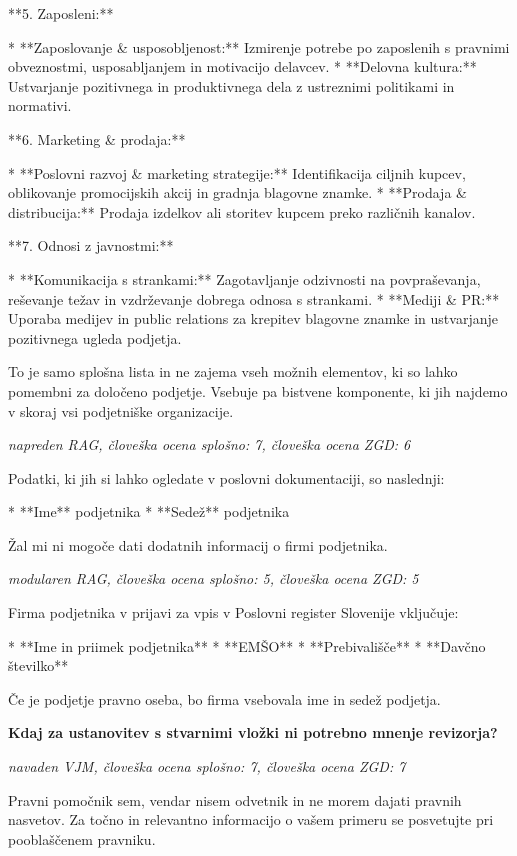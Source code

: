 \documentclass[a4paper,12pt,openright]{book}
\begin{document}
**5. Zaposleni:**

* **Zaposlovanje \& usposobljenost:** Izmirenje potrebe po zaposlenih s pravnimi obveznostmi, usposabljanjem in motivacijo delavcev.
* **Delovna kultura:** Ustvarjanje pozitivnega in produktivnega dela z ustreznimi politikami in normativi.

**6. Marketing \& prodaja:**

* **Poslovni razvoj \& marketing strategije:**  Identifikacija ciljnih kupcev, oblikovanje promocijskih akcij in gradnja blagovne znamke.
* **Prodaja \& distribucija:** Prodaja izdelkov ali storitev kupcem preko različnih kanalov.

**7. Odnosi z javnostmi:**

* **Komunikacija s strankami:** Zagotavljanje odzivnosti na povpraševanja, reševanje težav in vzdrževanje dobrega odnosa s strankami.
* **Mediji \& PR:** Uporaba medijev in public relations za krepitev blagovne znamke in ustvarjanje pozitivnega ugleda podjetja.


To je samo splošna lista in ne zajema vseh možnih elementov, ki so lahko pomembni za določeno podjetje. Vsebuje pa bistvene komponente, ki jih najdemo v skoraj vsi podjetniške organizacije.

\vspace{0.5cm}
\textit{napreden RAG, človeška ocena splošno: 7, človeška ocena ZGD: 6}

Podatki, ki jih si lahko ogledate v poslovni dokumentaciji, so naslednji:

* **Ime** podjetnika
* **Sedež** podjetnika


Žal mi ni mogoče dati dodatnih informacij o firmi podjetnika.

\vspace{0.5cm}
\textit{modularen RAG, človeška ocena splošno: 5, človeška ocena ZGD: 5}

Firma podjetnika v prijavi za vpis v Poslovni register Slovenije vključuje:

* **Ime in priimek podjetnika**
* **EMŠO**
* **Prebivališče**
* **Davčno številko**


Če je podjetje pravno oseba, bo firma vsebovala ime in sedež podjetja.

\vspace{0.5cm}
\textbf{Kdaj za ustanovitev s stvarnimi vložki ni potrebno mnenje revizorja?}

\textit{navaden VJM, človeška ocena splošno: 7, človeška ocena ZGD: 7}

Pravni pomočnik sem, vendar nisem odvetnik in ne morem dajati pravnih nasvetov. Za točno in relevantno informacijo o vašem primeru se posvetujte pri pooblaščenem pravniku.
\end{document}
